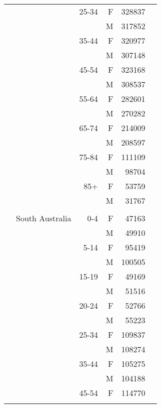 \begin{tabular}{@{}c@{}rrrr@{}c@{}}
\phantom{.} &                                &  25-34 &  F &  328837 &\tabularnewline\relax 
\phantom{.} &                                &        &  M &  317852 &\tabularnewline\relax 
\phantom{.} &                                &  35-44 &  F &  320977 &\tabularnewline\relax 
\phantom{.} &                                &        &  M &  307148 &\tabularnewline\relax 
\phantom{.} &                                &  45-54 &  F &  323168 &\tabularnewline\relax 
\phantom{.} &                                &        &  M &  308537 &\tabularnewline\relax 
\phantom{.} &                                &  55-64 &  F &  282601 &\tabularnewline\relax 
\phantom{.} &                                &        &  M &  270282 &\tabularnewline\relax 
\phantom{.} &                                &  65-74 &  F &  214009 &\tabularnewline\relax 
\phantom{.} &                                &        &  M &  208597 &\tabularnewline\relax 
\phantom{.} &                                &  75-84 &  F &  111109 &\tabularnewline\relax 
\phantom{.} &                                &        &  M &   98704 &\tabularnewline\relax 
\phantom{.} &                                &    85+ &  F &   53759 &\tabularnewline\relax 
\phantom{.} &                                &        &  M &   31767 &\tabularnewline\relax 
\phantom{.} &            &            &            &            &\tabularnewline[0.5\baselineskip]
\phantom{.} &                South Australia &    0-4 &  F &   47163 &\tabularnewline\relax 
\phantom{.} &                                &        &  M &   49910 &\tabularnewline\relax 
\phantom{.} &                                &   5-14 &  F &   95419 &\tabularnewline\relax 
\phantom{.} &                                &        &  M &  100505 &\tabularnewline\relax 
\phantom{.} &                                &  15-19 &  F &   49169 &\tabularnewline\relax 
\phantom{.} &                                &        &  M &   51516 &\tabularnewline\relax 
\phantom{.} &                                &  20-24 &  F &   52766 &\tabularnewline\relax 
\phantom{.} &                                &        &  M &   55223 &\tabularnewline\relax 
\phantom{.} &                                &  25-34 &  F &  109837 &\tabularnewline\relax 
\phantom{.} &                                &        &  M &  108274 &\tabularnewline\relax 
\phantom{.} &                                &  35-44 &  F &  105275 &\tabularnewline\relax 
\phantom{.} &                                &        &  M &  104188 &\tabularnewline\relax 
\phantom{.} &                                &  45-54 &  F &  114770 &\tabularnewline\relax 

\end{tabular}
